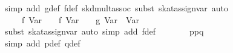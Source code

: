 \begin{isabellebody}
\ {}simp\ add{}\ g{}def\ f{}def\ skd{}mult{}assoc{}\ subst\ skat{}assign{}{}var{}\ auto{}\isanewline
\ \ \isamarkupfalse%
\ \isamarkupfalse%
\ {}{}{}{}\ {}\ {}\ {}{}\ f\ {}Var\ {}{}{}\ {}\ {}{}\ f\ {}Var\ {}{}{}\ {}\ {}{}\ g\ {}Var\ {}{}\ {}Var\ {}{}{}\isanewline
\ \ \ \ \isamarkupfalse%
\ {}subst\ skat{}assign{}{}var{}\ {}auto\ simp\ add{}\ f{}def{}\isanewline
\ \ \isamarkupfalse%
\ \isamarkupfalse%
\ {}{}{}{}\ {}\ p{}{}{}p{}{}{}q{}{}{}{}\isanewline
\ \ \ \ \isamarkupfalse%
\ {}simp\ add{}\ p{}def\ q{}def{}\isanewline

\end{isabellebody}
